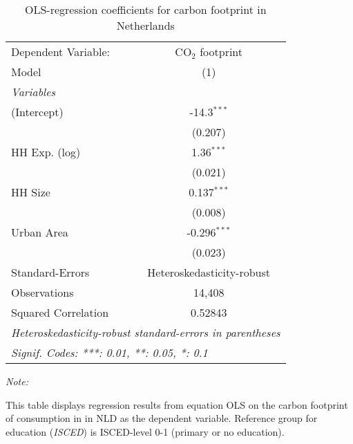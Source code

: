 
\begin{table}[htbp!]
   \centering
   \small
   \begin{adjustbox}{width = 1\textwidth, max height = 0.95\textheight, center}
      \begin{threeparttable}[b]
         \caption{\label{tab:OLS_2_NLD} OLS-regression coefficients for carbon footprint in Netherlands}
         \begin{tabular}{lc}
            \tabularnewline \midrule \midrule
            Dependent Variable: & CO$_{2}$ footprint\\  
            Model               & (1)\\  
            \midrule
            \emph{Variables}\\
            (Intercept)         & -14.3$^{***}$\\   
                                & (0.207)\\   
            HH Exp. (log)       & 1.36$^{***}$\\   
                                & (0.021)\\   
            HH Size             & 0.137$^{***}$\\   
                                & (0.008)\\   
            Urban Area          & -0.296$^{***}$\\   
                                & (0.023)\\   
            \midrule 
            Standard-Errors     & Heteroskedasticity-robust \\   
            Observations        & 14,408\\  
            Squared Correlation & 0.52843\\  
            \midrule \midrule
            \multicolumn{2}{l}{\emph{Heteroskedasticity-robust standard-errors in parentheses}}\\
            \multicolumn{2}{l}{\emph{Signif. Codes: ***: 0.01, **: 0.05, *: 0.1}}\\
         \end{tabular}
         
         \begin{tablenotes}\item \medskip \textit{Note:}
            \item This table displays regression results from equation OLS on the carbon footprint of consumption in  in NLD as the dependent variable.  Reference group for education (\textit{ISCED}) is ISCED-level 0-1 (primary or no education).
         \end{tablenotes}
      \end{threeparttable}
   \end{adjustbox}
\end{table}



